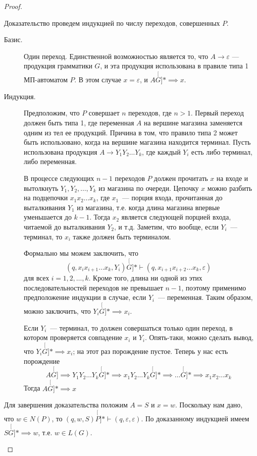 \documentclass[a4paper,12pt]{article}
\begin{document}
\begin{proof}
\begin{description}
		Доказательство проведем индукцией по числу переходов, совершенных $P$.
		\begin{description}
			\item[Базис.] Один переход. Единственной возможностью является то, что $A \to \varepsilon$ — продукция грамматики $G$, и эта продукция использована в правиле типа 1 МП-автоматом $P$.
			В этом случае $x = \varepsilon$, и $A \stackrel[G]{*}{\implies} x$.
			\item[Индукция.] Предположим, что $P$ совершает $n$ переходов, где $n > 1$. Первый переход должен быть типа 1, где переменная $A$ на вершине магазина заменяется одним из тел ее продукций. Причина в том, что правило типа 2 может быть использовано, когда на вершине магазина находится терминал. Пусть использована продукция $A \to Y_1 Y_2 \ldots Y_k$, где каждый $Y_i$ есть либо терминал, либо переменная.
			
			В процессе следующих $n - 1$ переходов $P$ должен прочитать $x$ на входе и вытолкнуть $Y_1, Y_2, \ldots, Y_k$ из магазина по очереди. Цепочку $x$ можно разбить на подцепочки $x_1 x_2 \ldots x_k$, где $x_1$~--- порция входа, прочитанная до выталкивания $Y_1$ из магазина, т.е. когда длина магазина впервые уменьшается до $k - 1$. Тогда $x_2$ является следующей порцией входа, читаемой до выталкивания $Y_2$, и т.д. Заметим, что вообще, если $Y_i$~--- терминал, то $x_i$ также должен быть терминалом.
			
			Формально мы можем заключить, что \[(q, x_i x_{i + 1} \ldots x_k, Y_i) \stackrel[G]{*}{\vdash} (q, x_{i + 1} x_{i + 2} \ldots x_k, \varepsilon)\] для всех $i = 1, 2, \ldots, k$. Кроме того, длина ни одной из этих последовательностей переходов не превышает $n - 1$, поэтому применимо предположение индукции в случае, если $Y_i$~--- переменная. Таким образом, можно заключить, что $Y_i \stackrel[G]{*}{\implies} x_i$.
			
			Если $Y_i$~--- терминал, то должен совершаться только один переход, в котором проверяется совпадение $x_i$ и $Y_i$. Опять-таки, можно сделать вывод, что $Y_i \stackrel[G]{*}{\implies} x_i$; на этот раз порождение пустое. Теперь у нас есть порождение
			\[A \stackrel[G]{}{\implies} Y_1 Y_2 \ldots Y_k \stackrel[G]{*}{\implies} x_1 Y_2 \ldots Y_k \stackrel[G]{*}{\implies} \ldots \stackrel[G]{*}{\implies} x_1 x_2 \ldots x_k\]
			Тогда $A \stackrel[G]{*}{\implies} x$
		\end{description}
		Для завершения доказательства положим $A = S$ и $x = w$. Поскольку нам дано, что $w \in N(P)$, то $(q, w, S) \stackrel[P]{*}{\vdash} (q, \varepsilon, \varepsilon)$. По доказанному индукцией имеем $S \stackrel[G]{*}{\implies} w$, т.е. $w \in L(G)$.  
	\end{description}
\end{proof}
\end{document}
